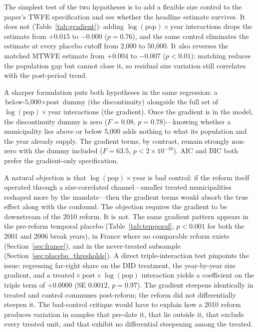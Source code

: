\documentclass[12pt,letterpaper]{article}
\begin{document}
The simplest test of the two hypotheses is to add a flexible size control to the paper's TWFE specification and see whether the headline estimate survives. It does not (Table~\ref{tab:gradient}): adding $\log(\text{pop}) \times \text{year}$ interactions drops the estimate from $+0.015$ to $-0.000$ ($p = 0.76$), and the same control eliminates the estimate at every placebo cutoff from 2,000 to 50,000. It also reverses the matched MTWFE estimate from $+0.004$ to $-0.007$ ($p < 0.01$): matching reduces the population gap but cannot close it, so residual size variation still correlates with the post-period trend.

A sharper formulation puts both hypotheses in the same regression: a $\text{below-5{,}000} \times \text{post}$ dummy (the discontinuity) alongside the full set of $\log(\text{pop}) \times \text{year}$ interactions (the gradient). Once the gradient is in the model, the discontinuity dummy is zero ($F = 0.08$, $p = 0.78$)---knowing whether a municipality lies above or below 5,000 adds nothing to what its population and the year already supply. The gradient terms, by contrast, remain strongly non-zero with the dummy included ($F = 63.5$, $p < 2 \times 10^{-16}$). AIC and BIC both prefer the gradient-only specification.



A natural objection is that $\log(\text{pop}) \times \text{year}$ is bad control: if the reform itself operated through a size-correlated channel---smaller treated municipalities reshaped more by the mandate---then the gradient terms would absorb the true effect along with the confound. The objection requires the gradient to be downstream of the 2010 reform. It is not. The same gradient pattern appears in the pre-reform temporal placebo (Table~\ref{tab:temporal}, $p < 0.001$ for both the 2001 and 2006 break years), in France where no comparable reform exists (Section~\ref{sec:france}), and in the never-treated subsample (Section~\ref{sec:placebo_thresholds}). A direct triple-interaction test pinpoints the issue: regressing far-right share on the DID treatment, the year-by-year size gradient, and a $\text{treated} \times \text{post} \times \log(\text{pop})$ interaction yields a coefficient on the triple term of $+0.0000$ (SE $0.0012$, $p = 0.97$). The gradient steepens identically in treated and control communes post-reform; the reform did not differentially steepen it. The bad-control critique would have to explain how a 2010 reform produces variation in samples that pre-date it, that lie outside it, that exclude every treated unit, and that exhibit no differential steepening among the treated.
\end{document}
